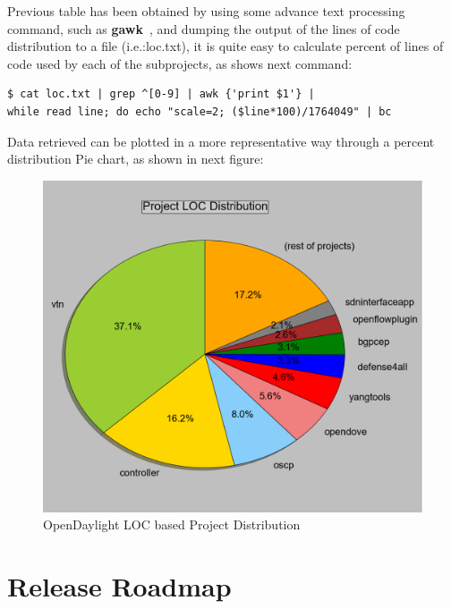 \documentclass[a4paper, 12pt]{book}
\begin{document}
Previous table has been obtained by using some advance text processing command, such as \textbf{gawk}~\cite{GAWK}, and dumping the output of the lines of code distribution to a file (i.e.:loc.txt), it is quite easy to calculate percent of lines of code used by each of the subprojects, as shows next command:
\begin{verbatim}
$ cat loc.txt | grep ^[0-9] | awk {'print $1'} |
while read line; do echo "scale=2; ($line*100)/1764049" | bc
\end{verbatim}
Data retrieved can be plotted in a more representative way through a percent distribution Pie chart, as shown in next figure:
\begin{figure}[H]
 \begin{center}
   \includegraphics[width=15cm]{img/sloc-project-distritbution-02.png}
   \caption{OpenDaylight LOC based Project Distribution}
   \label{fig:odl_prog_loc_dist_diagram}
 \end{center}
\end{figure}

\section{Release Roadmap}
\label{chap:odl_release_roadmap}
\end{document}
